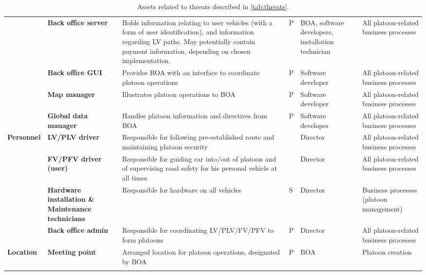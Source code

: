 \documentclass[british,11pt,a4paper]{article}
\begin{document}
\begin{longtable}{|p{2cm}|p{2cm}|p{5cm}|p{1cm}|p{2cm}|p{3cm}|}
 & \textbf{Back office server} & Holds information relating to user vehicles (with a form of user identification), and information regarding LV paths. May potentially contain payment information, depending on chosen implementation. & P & BOA, software developers, installation technician & All platoon-related business processes \\ \cline{2-6} 
 & \textbf{Back office GUI} & Provides BOA with an interface to coordinate platoon operations & P & Software developer & All platoon-related business processes \\ \cline{2-6} 
 & \textbf{Map manager} & Illustrates platoon operations to BOA & P & Software developer & All platoon-related business processes \\ \cline{2-6} 
 & \textbf{Global data manager} & Handles platoon information and directives from BOA & P & Software developer & All platoon-related business processes \\ \hline
\multirow{4}{2cm}{\textbf{Personnel}} & \textbf{LV/PLV driver} & Responsible for following pre-established route and maintaining platoon security &  & Director & All platoon-related business processes \\ \cline{2-6} 
 & \textbf{FV/PFV driver (user)} & Responsible for guiding car into/out of platoon and of supervising road safety for his personal vehicle at all times &  & Director & All platoon-related business processes \\ \cline{2-6} 
 & \textbf{Hardware installation \& Maintenance technicians} & Responsible for hardware on all vehicles & S & Director & Business processes (platoon management) \\ \cline{2-6} 
 & \textbf{Back office admin} & Responsible for coordinating LV/PLV/FV/PFV to form platoons & P & Director & All platoon-related business processes \\ \hline
\textbf{Location} & \textbf{Meeting point} & Arranged location for platoon operations, designated by BOA & P & BOA & Platoon creation \\ \hline
\caption{Assets related to threats described in \autoref{tab:threats}.}
\label{tab:assets}
\end{longtable}
\end{document}
